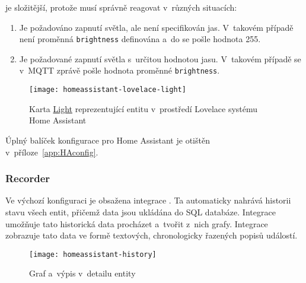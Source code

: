  je složitější, protože musí správně reagovat
v~různých situacích:
\begin{enumerate}[nosep]
    \item Je požadováno zapnutí světla, ale není specifikován jas. V~takovém
        případě není proměnná \texttt{brightness} definována a~do
         se pošle hodnota \num{255}.
    \item Je požadované zapnutí světla s~určitou hodnotou jasu. V~takovém
        případě se v~MQTT zprávě pošle hodnota proměnné \texttt{brightness}.
\end{enumerate}
\nocite{HAdocs}

\begin{figure}[htb]
    \centering
    \texttt{[image: homeassistant-lovelace-light]}
    \caption{%
        Karta \href{https://www.home-assistant.io/lovelace/light/}{Light}
        reprezentující entitu  v~prostředí
        Lovelace systému Home Assistant
    }
    \label{fig:homeassistant lovelace light}
\end{figure}

Úplný balíček konfigurace pro Home Assistant je otištěn
v~příloze~\vref{app:HAconfig}.


\subsubsection{Recorder}
Ve výchozí konfiguraci je obsažena integrace . Ta
automaticky nahrává historii stavu všech entit, přičemž data jsou ukládána do
SQL databáze. Integrace  umožňuje tato historická data
procházet a~tvořit z~nich grafy. Integrace  zobrazuje
tato data ve formě textových, chronologicky řazených popisů událostí.

\begin{figure}[htb]
    \centering
    \texttt{[image: homeassistant-history]}
    \caption{%
        Graf  a~výpis  v~detailu
        entity 
    }
    \label{fig:homeassistant lovelace light history}
\end{figure}
